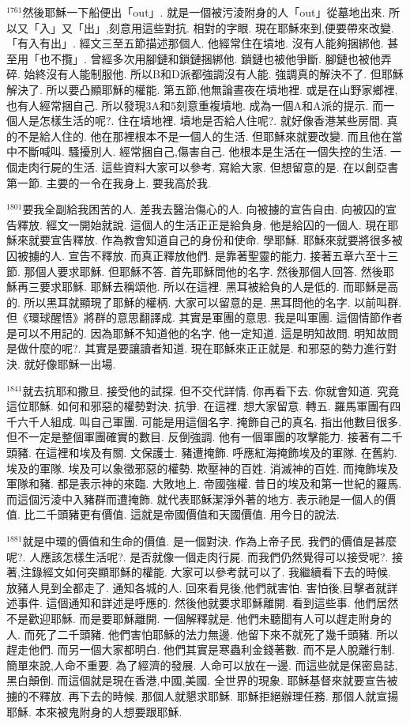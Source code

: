 \documentclass{book}
\begin{document}
$^{1761}$然後耶穌一下船便出「out」.
就是一個被污淩附身的人「out」從墓地出來.
所以又「入」又「出」,刻意用這些對抗.
相對的字眼.
現在耶穌來到,便要帶來改變.
「有入有出」.
經文三至五節描述那個人.
他經常住在墳地.
沒有人能夠捆綁他.
甚至用「也不攬」.
曾經多次用腳鏈和鎖鏈捆綁他.
鎖鏈也被他爭斷.
腳鏈也被他弄碎.
始終沒有人能制服他.
所以B和D派都強調沒有人能.
強調真的解決不了.
但耶穌解決了.
所以要凸顯耶穌的權能.
第五節,他無論晝夜在墳地裡.
或是在山野家鄉裡,也有人經常捆自己.
所以發現3A和5刻意重複墳地.
成為一個A和A派的提示.
而一個人是怎樣生活的呢?.
住在墳地裡.
墳地是否給人住呢?.
就好像香港某些房間.
真的不是給人住的.
他在那裡根本不是一個人的生活.
但耶穌來就要改變.
而且他在當中不斷喊叫.
騷擾別人.
經常捆自己,傷害自己.
他根本是生活在一個失控的生活.
一個走肉行屍的生活.
這些資料大家可以參考.
寫給大家.
但想留意的是.
在以創亞書第一節.
主要的一令在我身上.
要我高於我.

$^{1801}$要我全副給我困苦的人.
差我去醫治傷心的人.
向被擄的宣告自由.
向被囚的宣告釋放.
經文一開始就說.
這個人的生活正正是給負身.
他是給囚的一個人.
現在耶穌來就要宣告釋放.
作為教會知道自己的身份和使命.
學耶穌.
耶穌來就要將很多被囚被擄的人.
宣告不釋放.
而真正釋放他們.
是靠著聖靈的能力.
接著五章六至十三節.
那個人要求耶穌.
但耶穌不答.
首先耶穌問他的名字.
然後那個人回答.
然後耶穌再三要求耶穌.
耶穌去稱頌他.
所以在這裡.
黑耳被給負的人是低的.
而耶穌是高的.
所以黑耳就顯現了耶穌的權柄.
大家可以留意的是.
黑耳問他的名字.
以前叫群.
但《環球醒悟》將群的意思翻譯成.
其實是軍團的意思.
我是叫軍團.
這個情節作者是可以不用記的.
因為耶穌不知道他的名字.
他一定知道.
這是明知故問.
明知故問是做什麼的呢?.
其實是要讓讀者知道.
現在耶穌來正正就是.
和邪惡的勢力進行對決.
就好像耶穌一出場.

$^{1841}$就去抗耶和撒旦.
接受他的試探.
但不交代詳情.
你再看下去.
你就會知道.
究竟這位耶穌.
如何和邪惡的權勢對決.
抗爭.
在這裡.
想大家留意.
轉五.
羅馬軍團有四千六千人組成.
叫自己軍團.
可能是用這個名字.
掩飾自己的真名.
指出他數目很多.
但不一定是整個軍團確實的數目.
反倒強調.
他有一個軍團的攻擊能力.
接著有二千頭豬.
在這裡和埃及有關.
文保護士.
豬遭掩飾.
呼應紅海掩飾埃及的軍隊.
在舊約.
埃及的軍隊.
埃及可以象徵邪惡的權勢.
欺壓神的百姓.
消滅神的百姓.
而掩飾埃及軍隊和豬.
都是表示神的來臨.
大敗地上.
帝國強權.
昔日的埃及和第一世紀的羅馬.
而這個污淩中入豬群而遭掩飾.
就代表耶穌潔淨外著的地方.
表示祂是一個人的價值.
比二千頭豬更有價值.
這就是帝國價值和天國價值.
用今日的說法.

$^{1881}$就是中環的價值和生命的價值.
是一個對決.
作為上帝子民.
我們的價值是甚麼呢?.
人應該怎樣生活呢?.
是否就像一個走肉行屍.
而我們仍然覺得可以接受呢?.
接著,注錄經文如何突顯耶穌的權能.
大家可以參考就可以了.
我繼續看下去的時候.
放豬人見到全都走了.
通知各城的人.
回來看見後,他們就害怕.
害怕後,目擊者就詳述事件.
這個通知和詳述是呼應的.
然後他就要求耶穌離開.
看到這些事.
他們居然不是歡迎耶穌.
而是要耶穌離開.
一個解釋就是.
他們未聽聞有人可以趕走附身的人.
而死了二千頭豬.
他們害怕耶穌的法力無邊.
他留下來不就死了幾千頭豬.
所以趕走他們.
而另一個大家都明白.
他們其實是寒蟲利金錢著數.
而不是人脫離行制.
簡單來說,人命不重要.
為了經濟的發展.
人命可以放在一邊.
而這些就是保密島誌,黑白顛倒.
而這個就是現在香港,中國,美國.
全世界的現象.
耶穌基督來就要宣告被擄的不釋放.
再下去的時候.
那個人就懇求耶穌.
耶穌拒絕辦理任務.
那個人就宣揚耶穌.
本來被鬼附身的人想要跟耶穌.
\end{document}
